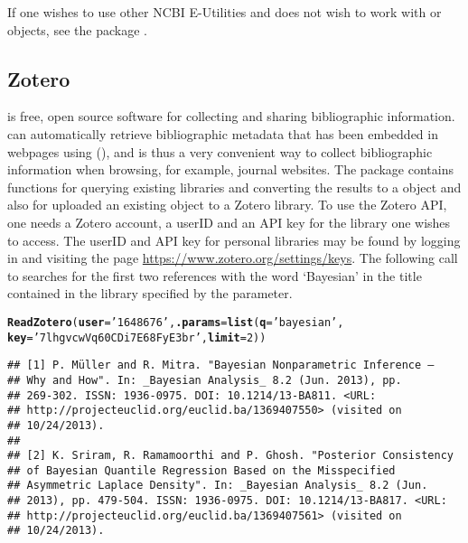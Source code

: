 \documentclass[article]{jss}\usepackage[]{graphicx}\usepackage[]{color}
\makeatletter
\newcommand{\hlnum}[1]{\textcolor[rgb]{0.125,0.125,1}{#1}}%
\newcommand{\hlstr}[1]{\textcolor[rgb]{0.125,0.125,1}{#1}}%
\newcommand{\hlstd}[1]{\textcolor[rgb]{0.251,0.251,0.282}{#1}}%
\newcommand{\hlkwc}[1]{\textcolor[rgb]{0.529,0,0.184}{\textbf{#1}}}%
\newcommand{\hlkwd}[1]{\textcolor[rgb]{0.251,0.251,0.282}{\textbf{#1}}}%
\newenvironment{kframe}{%
 \def\at@end@of@kframe{}%
 \ifinner\ifhmode%
  \def\at@end@of@kframe{\end{minipage}}%
  \begin{minipage}{\columnwidth}%
 \fi\fi%
 \def\FrameCommand##1{\hskip\@totalleftmargin \hskip-\fboxsep
 \colorbox{shadecolor}{##1}\hskip-\fboxsep
     \hskip-\linewidth \hskip-\@totalleftmargin \hskip\columnwidth}%
 \MakeFramed {\advance\hsize-\width
   \@totalleftmargin\z@ \linewidth\hsize
   \@setminipage}}%
 {\par\unskip\endMakeFramed%
 \at@end@of@kframe}
\newenvironment{knitrout}{}{} %
\newcommand{\ourpkg}{\pkg{RefManageR}}
\makeatother
\begin{document}
If one wishes to use other NCBI E-Utilities and does not wish to work with  or  objects, see the  package \citep{rentrez}.
\subsection{Zotero}
 is free, open source software for collecting and sharing bibliographic information.   can automatically retrieve bibliographic metadata that has been embedded in webpages using  (), and is thus a very convenient way to collect bibliographic information when browsing, for example, journal websites.  The \ourpkg{} package contains functions for querying existing  libraries and converting the results to a  object and also for uploaded an existing  object to a Zotero library.  To use the Zotero API, one needs a Zotero account, a userID and an API key for the library one wishes to access.  The userID and API key for personal libraries may be found by logging in and visiting the page \url{https://www.zotero.org/settings/keys}.  The following call to  searches for the first two references with the word `Bayesian' in the title contained in the library specified by the  parameter.
\begin{knitrout}
\color{fgcolor}\begin{kframe}
\begin{alltt}
\hlkwd{ReadZotero}\hlstd{(}\hlkwc{user} \hlstd{=} \hlstr{'1648676'}\hlstd{,} \hlkwc{.params} \hlstd{=} \hlkwd{list}\hlstd{(}\hlkwc{q} \hlstd{=} \hlstr{'bayesian'}\hlstd{,}
                               \hlkwc{key} \hlstd{=} \hlstr{'7lhgvcwVq60CDi7E68FyE3br'}\hlstd{,} \hlkwc{limit} \hlstd{=} \hlnum{2}\hlstd{))}
\end{alltt}
\begin{verbatim}
## [1] P. Müller and R. Mitra. "Bayesian Nonparametric Inference –
## Why and How". In: _Bayesian Analysis_ 8.2 (Jun. 2013), pp.
## 269-302. ISSN: 1936-0975. DOI: 10.1214/13-BA811. <URL:
## http://projecteuclid.org/euclid.ba/1369407550> (visited on
## 10/24/2013).
## 
## [2] K. Sriram, R. Ramamoorthi and P. Ghosh. "Posterior Consistency
## of Bayesian Quantile Regression Based on the Misspecified
## Asymmetric Laplace Density". In: _Bayesian Analysis_ 8.2 (Jun.
## 2013), pp. 479-504. ISSN: 1936-0975. DOI: 10.1214/13-BA817. <URL:
## http://projecteuclid.org/euclid.ba/1369407561> (visited on
## 10/24/2013).
\end{verbatim}
\end{kframe}
\end{knitrout}
\end{document}
